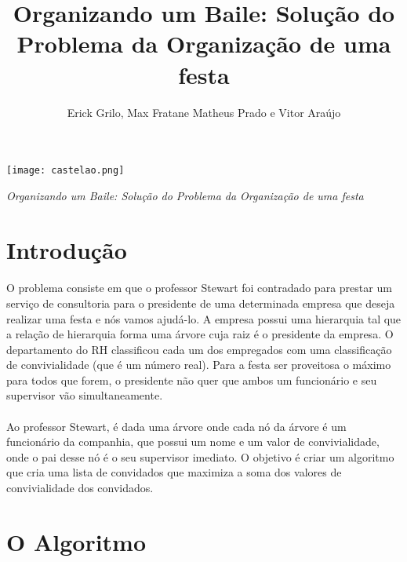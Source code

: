 \documentclass[a4paper]{article}
\title{Organizando um Baile: Solução do Problema da Organização de uma festa}
\author{Erick Grilo, Max Fratane   Matheus Prado e Vitor Araújo}
\begin{document}
\begin{flushright}
\thispagestyle{empty}
\texttt{[image: castelao.png]}
\end{flushright}

\begin{center}
\vfill
\vspace{-7em}
\emph{\Large Organizando um Baile: Solução do Problema da Organização de uma festa}
\begin{flushright}
\vspace{1em}
\end{flushright}
\vfill
\end{center}

\newpage

\section{Introdução}
\paragraph{} O problema consiste em que o professor Stewart foi contradado para prestar um serviço de consultoria para o presidente de uma determinada empresa que deseja realizar uma festa e nós vamos ajudá-lo. A empresa possui uma hierarquia tal que a relação de hierarquia forma uma árvore 
cuja raiz é o presidente da empresa. O departamento do RH classificou cada um dos empregados com uma classificação de convivialidade (que é um número real). Para a festa ser proveitosa o máximo para todos que forem, o presidente não quer que ambos um funcionário e seu supervisor vão simultaneamente.
\paragraph{} Ao professor Stewart, é dada uma árvore
onde cada nó da árvore é um funcionário da companhia, que possui um nome e um valor de convivialidade, onde o pai desse nó é o seu supervisor imediato. O objetivo é criar um algoritmo que cria uma lista de convidados que maximiza a soma dos valores de convivialidade dos convidados.

\section{O Algoritmo}\label{sec:rec}
\end{document}
